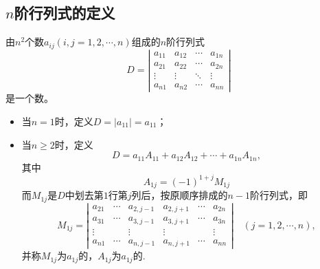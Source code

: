 \subsection{$n$阶行列式的定义}
\begin{frame}
\begin{dingyi}[$n$阶行列式]
  由$n^2$个数$a_{ij}(i,j=1,2,\cdots,n)$组成的$n$阶行列式
  \begin{equation}\label{Dn}
    D = \left|
      \begin{array}{cccc}
        a_{11}  &  a_{12} & \cdots & a_{1n} \\
        a_{21}  &  a_{22} & \cdots & a_{2n} \\
        \vdots & \vdots & \ddots & \vdots\\  
        a_{n1}  &  a_{n2} & \cdots & a_{nn} 
      \end{array}
    \right|
  \end{equation}
  是一个数。
  \begin{itemize}
  \item 当$n=1$时，定义$D=|a_{11}|=a_{11}$； 
  \item 当$n\ge2$时，定义
    \begin{equation}
      D = a_{11} A_{11} + a_{12} A_{12} + \cdots + a_{1n} A_{1n},
    \end{equation}
    其中
    $$A_{1j} = (-1)^{1+j} M_{1j}$$
    而$M_{1j}$是$D$中划去第$1$行第$j$列后，按原顺序排成的$n-1$阶行列式，即
    $$
    M_{1j} =   \left|
      \begin{array}{cccccc}
        a_{21}  & \cdots&  a_{2,j-1}  &  a_{2,j+1}  & \cdots & a_{2n} \\
        a_{31}  & \cdots&  a_{3,j-1}  &  a_{3,j+1}  & \cdots & a_{3n} \\
        \vdots &       &  \vdots &  \vdots &  & \vdots\\  
        a_{n1}  & \cdots&  a_{n,j-1}  &  a_{n,j+1}  & \cdots & a_{nn} 
      \end{array}
    \right| \quad (j = 1,2,\cdots, n),
    $$
    并称$M_{1j}$为$a_{1j}$的，$A_{1j}$为$a_{1j}$的.
  \end{itemize}
\end{dingyi}
\end{frame}

